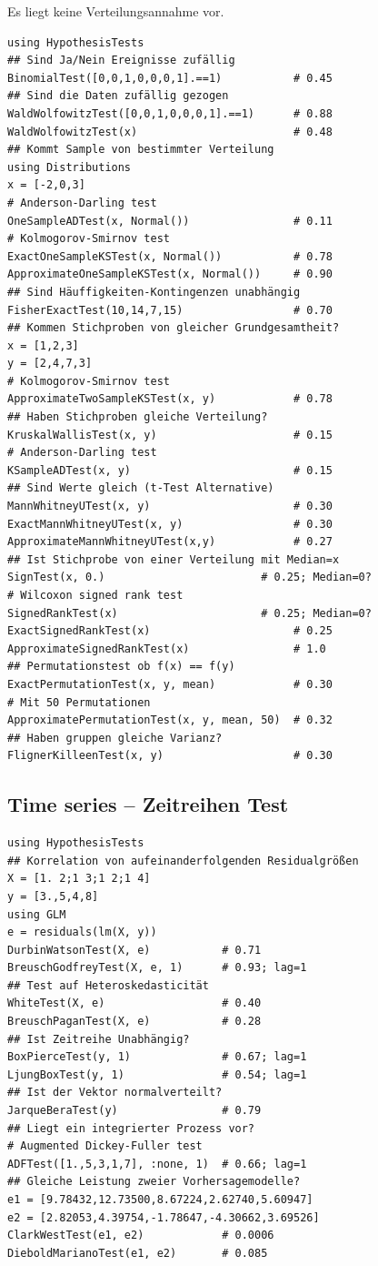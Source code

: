 \documentclass[10pt,twocolumn]{scrartcl}
\begin{document}
Es liegt keine Verteilungsannahme vor.

\begin{lstlisting}
using HypothesisTests
## Sind Ja/Nein Ereignisse zufällig
BinomialTest([0,0,1,0,0,0,1].==1)           # 0.45
## Sind die Daten zufällig gezogen
WaldWolfowitzTest([0,0,1,0,0,0,1].==1)      # 0.88
WaldWolfowitzTest(x)                        # 0.48
## Kommt Sample von bestimmter Verteilung
using Distributions
x = [-2,0,3]
# Anderson-Darling test
OneSampleADTest(x, Normal())                # 0.11
# Kolmogorov-Smirnov test
ExactOneSampleKSTest(x, Normal())           # 0.78
ApproximateOneSampleKSTest(x, Normal())     # 0.90
## Sind Häuffigkeiten-Kontingenzen unabhängig
FisherExactTest(10,14,7,15)                 # 0.70
## Kommen Stichproben von gleicher Grundgesamtheit?
x = [1,2,3]
y = [2,4,7,3]
# Kolmogorov-Smirnov test
ApproximateTwoSampleKSTest(x, y)            # 0.78
## Haben Stichproben gleiche Verteilung?
KruskalWallisTest(x, y)                     # 0.15
# Anderson-Darling test
KSampleADTest(x, y)                         # 0.15
## Sind Werte gleich (t-Test Alternative)
MannWhitneyUTest(x, y)                      # 0.30
ExactMannWhitneyUTest(x, y)                 # 0.30
ApproximateMannWhitneyUTest(x,y)            # 0.27
## Ist Stichprobe von einer Verteilung mit Median=x
SignTest(x, 0.)                        # 0.25; Median=0?
# Wilcoxon signed rank test
SignedRankTest(x)                      # 0.25; Median=0?
ExactSignedRankTest(x)                      # 0.25
ApproximateSignedRankTest(x)                # 1.0
## Permutationstest ob f(x) == f(y)
ExactPermutationTest(x, y, mean)            # 0.30
# Mit 50 Permutationen
ApproximatePermutationTest(x, y, mean, 50)  # 0.32
## Haben gruppen gleiche Varianz?
FlignerKilleenTest(x, y)                    # 0.30
\end{lstlisting}

\subsection{Time series -- Zeitreihen Test}

\begin{lstlisting}
using HypothesisTests
## Korrelation von aufeinanderfolgenden Residualgrößen
X = [1. 2;1 3;1 2;1 4]
y = [3.,5,4,8]
using GLM
e = residuals(lm(X, y))
DurbinWatsonTest(X, e)           # 0.71
BreuschGodfreyTest(X, e, 1)      # 0.93; lag=1
## Test auf Heteroskedasticität
WhiteTest(X, e)                  # 0.40
BreuschPaganTest(X, e)           # 0.28
## Ist Zeitreihe Unabhängig?
BoxPierceTest(y, 1)              # 0.67; lag=1
LjungBoxTest(y, 1)               # 0.54; lag=1
## Ist der Vektor normalverteilt?
JarqueBeraTest(y)                # 0.79
## Liegt ein integrierter Prozess vor?
# Augmented Dickey-Fuller test
ADFTest([1.,5,3,1,7], :none, 1)  # 0.66; lag=1
## Gleiche Leistung zweier Vorhersagemodelle?
e1 = [9.78432,12.73500,8.67224,2.62740,5.60947]
e2 = [2.82053,4.39754,-1.78647,-4.30662,3.69526]
ClarkWestTest(e1, e2)            # 0.0006
DieboldMarianoTest(e1, e2)       # 0.085
\end{lstlisting}
\end{document}
